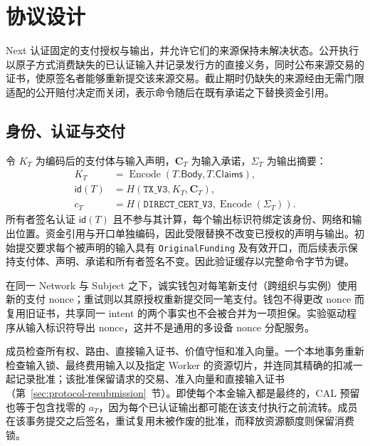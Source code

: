 
\section{协议设计}
\label{sec:protocol}

Next 认证固定的支付授权与输出，并允许它们的来源保持未解决状态。公开执行以原子方式消费缺失的已认证输入并记录发行方的直接义务，同时公布来源交易的证书，使原签名者能够重新提交该来源交易。截止期时仍缺失的来源经由无需门限适配的公开赔付决定而关闭，表示命令随后在既有承诺之下替换资金引用。

\subsection{身份、认证与交付}
\label{sec:protocol-certification}

令 $K_T$ 为编码后的支付体与输入声明，$\mathbf{C}_T$ 为输入承诺，$\Sigma_T$ 为输出摘要：
\begin{equation}
  \begin{aligned}
    K_T &= \operatorname{Encode}(T.\mathsf{Body},T.\mathsf{Claims}),\\
    \mathsf{id}(T) &= H(\texttt{TX\_V3},K_T,\mathbf{C}_T),\\
    c_T &= H(\texttt{DIRECT\_CERT\_V3},\operatorname{Encode}(\Sigma_T)).
  \end{aligned}
  \label{eq:protocol-identities}
\end{equation}
所有者签名认证 $\mathsf{id}(T)$ 且不参与其计算，每个输出标识符绑定该身份、网络和输出位置。资金引用与开口单独编码，因此受限替换不改变已授权的声明与输出。初始提交要求每个被声明的输入具有 \texttt{OriginalFunding} 及有效开口，而后续表示保持支付体、声明、承诺和所有者签名不变。因此验证缓存以完整命令字节为键。

在同一 Network 与 Subject 之下，诚实钱包对每笔新支付（跨组织与实例）使用新的支付 nonce；重试则以其原授权重新提交同一笔支付。钱包不得更改 nonce 而复用旧证书，共享同一 intent 的两个事实也不会被合并为一项担保。实验驱动程序从输入标识符导出 nonce，这并不是通用的多设备 nonce 分配服务。

成员检查所有权、路由、直接输入证书、价值守恒和准入向量。一个本地事务重新检查输入锁、最终费用输入以及指定 Worker 的资源切片，并连同其精确的扣减一起记录批准；该批准保留请求的交易、准入向量和直接输入证书（第~\ref{sec:protocol-resubmission}~节）。即使每个本金输入都是最终的，CAL 预留也等于包含找零的 $a_T$，因为每个已认证输出都可能在该支付执行之前流转。成员在该事务提交之后签名，重试复用未被作废的批准，而释放资源额度则保留消费锁。

